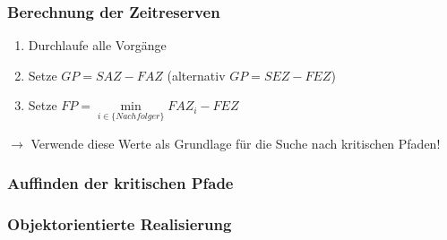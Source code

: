 \documentclass[ngerman, t]{beamer}
\begin{document}
\begin{frame}
  \frametitle{Berechnung der Zeitreserven}
  \begin{enumerate}
    \item Durchlaufe alle Vorg\"ange
    \item Setze $GP=SAZ-FAZ$ (alternativ $GP=SEZ-FEZ$)
    \item Setze $FP=\min\limits_{i \in \{Nachfolger\}} FAZ_i - FEZ$
  \end{enumerate}
  $\rightarrow$ Verwende diese Werte als Grundlage f\"ur die Suche
  nach kritischen Pfaden!
\end{frame}

\begin{frame}
  \frametitle{Auffinden der kritischen Pfade}
  \begin{figure}
    \resizebox{!}{100px}{}
  \end{figure}
\end{frame}

\begin{frame}
  \frametitle{Objektorientierte Realisierung}
  \begin{figure}
    \resizebox{!}{200px}{
      
    }
  \end{figure}
\end{frame}
\end{document}
